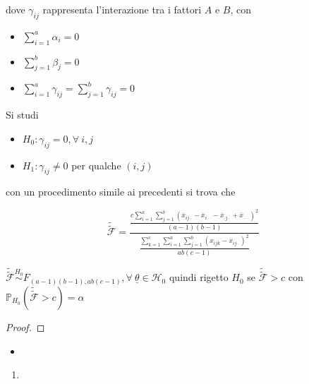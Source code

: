 \documentclass[hidelinks, 10pt]{report}
\begin{document}
dove $ \gamma_{ij} $ rappresenta l'interazione tra i fattori $ A $ e $ B $, con
\begin{itemize}
\item $ \sum\limits_{i = 1}^{a} \alpha_{i} = 0 $
\item $ \sum\limits_{j = 1}^{b} \beta_{j} = 0 $
\item $ \sum\limits_{i = 1}^{a} \gamma_{ij} = \sum\limits_{j = 1}^{b} \gamma_{ij} = 0 $
\end{itemize}

Si studi
\begin{itemize}
\item $ H_{0}: \gamma_{ij} = 0, \forall\ i, j $
\item $ H_{1}: \gamma_{ij} \ne 0 $ per qualche $ (i, j) $
\end{itemize}

con un procedimento simile ai precedenti si trova che

\[ \tilde{\tilde{\mathcal{F}}} = \frac{\frac{c \sum\limits_{i = 1}^{a} \sum\limits_{j = 1}^{b} (\overline{x}_{i j \cdot} - \overline{x}_{i \cdot \cdot} - \overline{x}_{\cdot j \cdot} + \overline{x}_{\cdot \cdot \cdot})^{2}}{(a - 1)(b - 1)}}{\frac{\sum\limits_{k = 1}^{c} \sum\limits_{i = 1}^{a} \sum\limits_{j = 1}^{b} (x_{ijk} - \overline{x}_{i j \cdot})^{2}}{ab (c - 1)}} \]

$ \tilde{\tilde{\mathcal{F}}} \stackrel{H_{0}}{\sim} F_{(a - 1)(b - 1), ab(c - 1)}, \forall\ \underline{\theta} \in \mathcal{H}_{0} $ quindi rigetto $ H_{0} $ se $ \tilde{\tilde{\mathcal{F}}} > c $ con $ \mathbb{P}_{H_{0}} (\tilde{\tilde{\mathcal{F}}} > c) = \alpha $ 


\begin{es}
\end{es}

\begin{es}
\end{es}

\begin{oss}
\end{oss}

\begin{thm}
\end{thm}

\begin{proof}
\end{proof}

\begin{itemize}
\item 
\end{itemize}

\begin{enumerate}
\item 
\end{enumerate}
\end{document}
